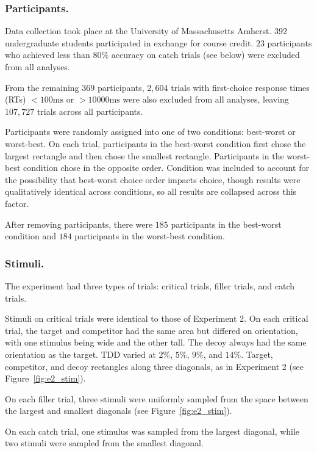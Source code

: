 \subsubsection{Participants.}
Data collection took place at the University of Massachusetts Amherst. $392$ undergraduate students participated in exchange for course credit. $23$ participants who achieved less than $80\%$ accuracy on catch trials (see below) were excluded from all analyses. 

From the remaining $369$ participants, $2,604$ trials with first-choice response times (RTs) $<100\text{ms}$ or $>10000\text{ms}$ were also excluded from all analyses, leaving $107,727$ trials across all participants.

Participants were randomly assigned into one of two conditions: best-worst or worst-best. On each trial, participants in the best-worst condition first chose the largest rectangle and then chose the smallest rectangle. Participants in the worst-best condition chose in the opposite order. Condition was included to account for the possibility that best-worst choice order impacts choice, though results were qualitatively identical across conditions, so all results are collapsed across this factor. 

After removing participants, there were $185$ participants in the best-worst condition and $184$ participants in the worst-best condition.

\subsubsection{Stimuli.}
The experiment had three types of trials: critical trials, filler trials, and catch trials. 

Stimuli on critical trials were identical to those of Experiment 2. On each critical trial, the target and competitor had the same area but differed on orientation, with one stimulus being wide and the other tall. The decoy always had the same orientation as the target. TDD varied at $2\%$, $5\%$, $9\%$, and $14\%$. Target, competitor, and decoy rectangles along three diagonals, as in Experiment 2 (see Figure~\ref{fig:e2_stim}). 

On each filler trial, three stimuli were uniformly sampled from the space between the largest and smallest diagonals (see Figure~\ref{fig:e2_stim}).

On each catch trial, one stimulus was sampled from the largest diagonal, while two stimuli were sampled from the smallest diagonal.

